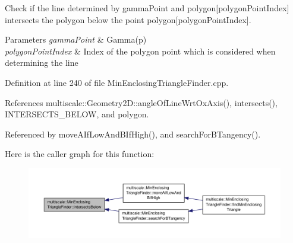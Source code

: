 Check if the line determined by gamma\-Point and polygon\mbox{[}polygon\-Point\-Index\mbox{]} intersects the polygon below the point polygon\mbox{[}polygon\-Point\-Index\mbox{]}. 


\begin{DoxyParams}{Parameters}
{\em gamma\-Point} & Gamma(p) \\
\hline
{\em polygon\-Point\-Index} & Index of the polygon point which is considered when determining the line \\
\hline
\end{DoxyParams}


Definition at line 240 of file Min\-Enclosing\-Triangle\-Finder.\-cpp.



References multiscale\-::\-Geometry2\-D\-::angle\-Of\-Line\-Wrt\-Ox\-Axis(), intersects(), I\-N\-T\-E\-R\-S\-E\-C\-T\-S\-\_\-\-B\-E\-L\-O\-W, and polygon.



Referenced by move\-A\-If\-Low\-And\-B\-If\-High(), and search\-For\-B\-Tangency().



Here is the caller graph for this function\-:\nopagebreak
\begin{figure}[H]
\begin{center}
\leavevmode
\includegraphics[width=350pt]{classmultiscale_1_1MinEnclosingTriangleFinder_a0abe1c7d5ef5a43f8ea1b404db0066e0_icgraph}
\end{center}
\end{figure}


